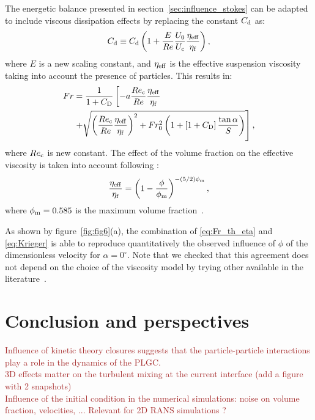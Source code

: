 \documentclass[twocolumn]{article}
\newcommand*{\julien}{\textcolor{brown}}
\begin{document}
The energetic balance presented in section~\ref{sec:influence_stokes} can be adapted to include viscous dissipation effects by replacing the constant $C_{\rm d}$ as:
\begin{equation}
	C_{\rm d} \equiv  C_{\rm d}\left(1 + \frac{E}{Re}\frac{U_0}{U_{\rm c}}\frac{\eta_{\rm eff}}{\eta_{\rm f}} \right),
\end{equation}
where $E$ is a new scaling constant, and $\eta_{\rm eff}$ is the effective suspension viscosity taking into account the presence of particles. This results in:
\begin{equation}
	\label{eq:Fr_th_eta}
	\begin{split}
		Fr & =  \frac{1}{1 + C_{\rm D}} \left[-a\frac{Re_{\rm c}}{Re}\frac{\eta_{\rm eff}}{\eta_{\rm f}} \right. \\
		&\left. +\sqrt{\left(\frac{Re_{\rm c}}{Re}\frac{\eta_{\rm eff}}{\eta_{\rm f}} \right)^{2} + Fr_0^{2} \left(1 + \left[1 + C_{\rm D}\right]\frac{\tan\alpha}{S} \right)}  \right],
	\end{split}
\end{equation}
where $Re_{\rm c}$ is new constant. The effect of the volume fraction on the effective viscosity is taken into account following \citet{krieger1959mechanism}:
\begin{equation}
	\label{eq:Krieger}
	\frac{\eta_{\rm eff}}{\eta_{\rm f}} = \left(1 - \frac{\phi}{\phi_{\rm m}}\right)^{-(5/2)\phi_{\rm m}},
\end{equation}
where $\phi_{\rm m} = 0.585$ is the maximum volume fraction~\citep{boyer2011unifying}.

As shown by figure~\ref{fig:fig6}(a), the combination of \eqref{eq:Fr_th_eta} and \eqref{eq:Krieger} is able to reproduce quantitatively the observed influence of $\phi$ of the dimensionless velocity for $\alpha=0^\circ$. Note that we checked that this agreement does not depend on the choice of the viscosity model by trying other available in the literature~\citep{stickel2005fluid, boyer2011unifying}.


\section{Conclusion and perspectives}

\julien{
	Influence of kinetic theory closures suggests that the particle-particle interactions play a role in the dynamics of the PLGC.\\
	3D effects matter on the turbulent mixing at the current interface (add a figure with 2 snapshots)\\
	Influence of the initial condition in the numerical simulations: noise on volume fraction, velocities, ... Relevant for 2D RANS simulations ?
}
\end{document}
